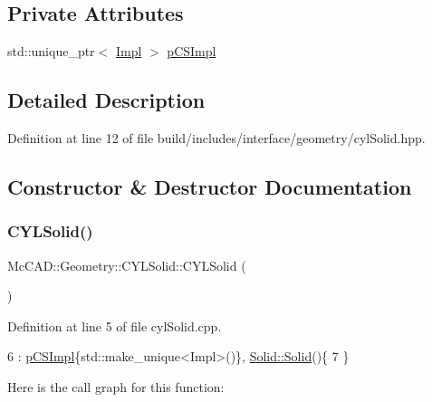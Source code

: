 \subsection*{Private Attributes}
\begin{DoxyCompactItemize}
\item 
std\+::unique\+\_\+ptr$<$ \hyperlink{classMcCAD_1_1Geometry_1_1CYLSolid_1_1Impl}{Impl} $>$ \hyperlink{classMcCAD_1_1Geometry_1_1CYLSolid_ae0aadc232a3721a7246cbfa0348c7c0b}{p\+C\+S\+Impl}
\end{DoxyCompactItemize}


\subsection{Detailed Description}


Definition at line 12 of file build/includes/interface/geometry/cyl\+Solid.\+hpp.



\subsection{Constructor \& Destructor Documentation}
\mbox{\label{classMcCAD_1_1Geometry_1_1CYLSolid_a170b8fe6e311517209ba9d4363d7ed5a}} 
\subsubsection{\texorpdfstring{C\+Y\+L\+Solid()}{CYLSolid()}\hspace{0.1cm}{\footnotesize\ttfamily [1/2]}}
{\footnotesize\ttfamily Mc\+C\+A\+D\+::\+Geometry\+::\+C\+Y\+L\+Solid\+::\+C\+Y\+L\+Solid (\begin{DoxyParamCaption}{ }\end{DoxyParamCaption})}



Definition at line 5 of file cyl\+Solid.\+cpp.


\begin{DoxyCode}
6   : \hyperlink{classMcCAD_1_1Geometry_1_1CYLSolid_ae0aadc232a3721a7246cbfa0348c7c0b}{pCSImpl}\{std::make\_unique<Impl>()\}, \hyperlink{classMcCAD_1_1Geometry_1_1Solid_ab54263b54174e2742c60e9c94e151819}{Solid::Solid}()\{
7 \}
\end{DoxyCode}
Here is the call graph for this function\+:
\mbox{\label{classMcCAD_1_1Geometry_1_1CYLSolid_ad83f5a6a4161bc1f8181b10f9695011d}} 

